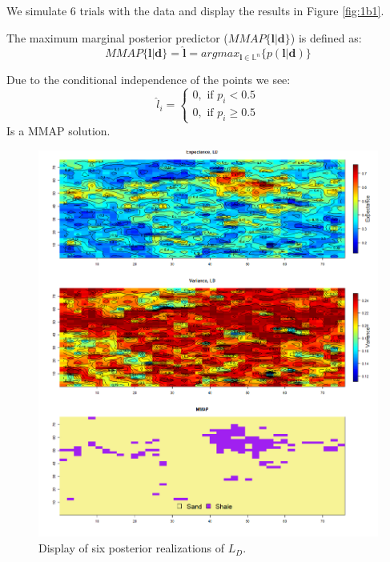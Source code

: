 \documentclass{article}
\newcommand{\vect}[1]{\ensuremath{\boldsymbol{\mathbf{#1}}}}
\begin{document}
	
	We simulate 6 trials with the data and display the results in Figure \ref{fig:1b1}. 
	
	The maximum marginal posterior predictor ($MMAP\lbrace \vect l | \vect d \rbrace$) is defined as: 
	\begin{equation}
		MMAP\lbrace \vect l | \vect d \rbrace = \vect{\hat l} = argmax_{\vect l \in \mathbb{L}^n}\lbrace p(\vect l | \vect d)\rbrace
	\end{equation}
	
	Due to the conditional independence of the points we see: 
	\begin{equation}
		\hat l_i = \begin{cases}
		0, \text{ if } p_i < 0.5 \\
		0, \text{ if } p_i \geq 0.5
		\end{cases}
	\end{equation}
	Is a MMAP solution. 
		\begin{figure}[h]	
		\begin{center} 
			\includegraphics[scale=0.48]{figure4.png}
		\end{center}
		\caption{Display of six posterior realizations of $L_D$.}
		\label{fig:1b2} 
	\end{figure}
	
\end{document}
